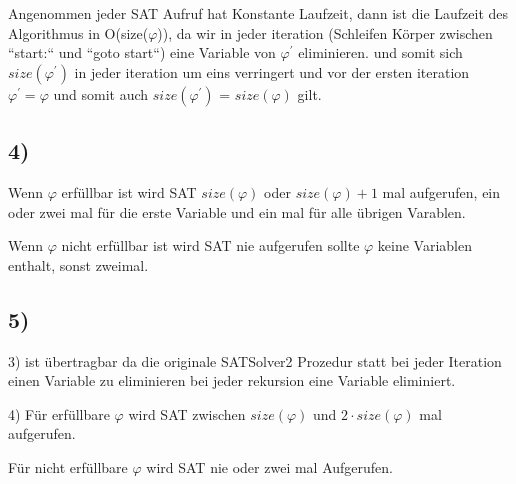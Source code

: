 Angenommen jeder SAT Aufruf hat Konstante Laufzeit, dann ist die Laufzeit des Algorithmus in O(size($\varphi$)), da wir in jeder iteration (Schleifen Körper zwischen ``start:`` und ``goto start``) eine Variable von $\varphi^\prime$ eliminieren. und somit sich $size(\varphi^\prime)$ in jeder iteration um eins verringert und vor der ersten iteration $\varphi^\prime = \varphi$ und somit auch $size(\varphi^\prime)$ = $size(\varphi)$  gilt.

\subsection*{4)}

Wenn $\varphi$ erfüllbar ist wird SAT $size(\varphi)$ oder $size(\varphi)+1$ mal aufgerufen, ein oder zwei mal für die erste Variable und ein mal für alle übrigen Varablen.

Wenn $\varphi$ nicht erfüllbar ist wird SAT nie aufgerufen sollte $\varphi$ keine Variablen enthalt, sonst zweimal.

\subsection*{5)}
3) ist übertragbar da die originale SATSolver2 Prozedur statt bei jeder Iteration einen Variable zu eliminieren bei jeder rekursion eine Variable eliminiert.

4) Für erfüllbare $\varphi$ wird SAT zwischen $size(\varphi)$ und $2 \cdot size(\varphi)$  mal aufgerufen.

Für nicht erfüllbare $\varphi$ wird SAT nie oder zwei mal Aufgerufen.

